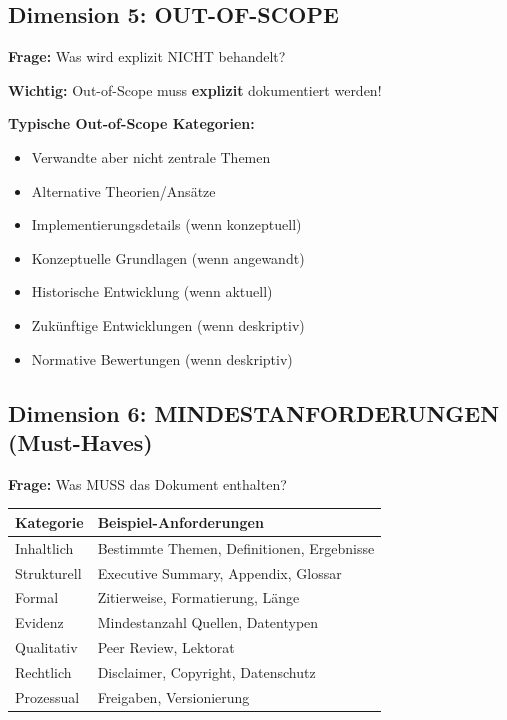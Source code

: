 \documentclass[12pt,a4paper]{article}
\begin{document}
\subsection{Dimension 5: OUT-OF-SCOPE}

\textbf{Frage:} Was wird explizit NICHT behandelt?

\begin{tcolorbox}[colback=red!5!white, colframe=red!75!black]
\textbf{Wichtig:} Out-of-Scope muss \textbf{explizit} dokumentiert werden!

\textbf{Typische Out-of-Scope Kategorien:}
\begin{itemize}[nosep]
\item Verwandte aber nicht zentrale Themen
\item Alternative Theorien/Ansätze
\item Implementierungsdetails (wenn konzeptuell)
\item Konzeptuelle Grundlagen (wenn angewandt)
\item Historische Entwicklung (wenn aktuell)
\item Zukünftige Entwicklungen (wenn deskriptiv)
\item Normative Bewertungen (wenn deskriptiv)
\end{itemize}
\end{tcolorbox}

\subsection{Dimension 6: MINDESTANFORDERUNGEN (Must-Haves)}

\textbf{Frage:} Was MUSS das Dokument enthalten?

\begin{table}[htbp]
\centering
\renewcommand{\arraystretch}{1.3}
\begin{tabular}{@{}lp{9cm}@{}}
\toprule
\textbf{Kategorie} & \textbf{Beispiel-Anforderungen} \\
\midrule
Inhaltlich & Bestimmte Themen, Definitionen, Ergebnisse \\
Strukturell & Executive Summary, Appendix, Glossar \\
Formal & Zitierweise, Formatierung, Länge \\
Evidenz & Mindestanzahl Quellen, Datentypen \\
Qualitativ & Peer Review, Lektorat \\
Rechtlich & Disclaimer, Copyright, Datenschutz \\
Prozessual & Freigaben, Versionierung \\
\bottomrule
\end{tabular}
\end{table}
\end{document}
